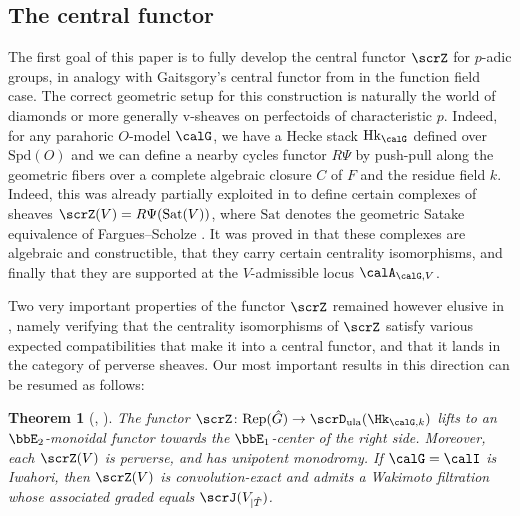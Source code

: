 \documentclass[10pt, reqno]{amsart}
\theoremstyle{plain}
\newtheorem{theorem}{Theorem}[section]
\theoremstyle{definition}
\numberwithin{equation}{section}
\begin{document}
	
	\subsection{The central functor}
	The first goal of this paper is to fully develop the central functor $\scrZ$ for $p$-adic groups, in analogy with Gaitsgory's central functor from \cite{Gai01} in the function field case. The correct geometric setup for this construction is naturally the world of diamonds or more generally v-sheaves on perfectoids of characteristic $p$. Indeed, for any parahoric $O$-model $\calG$, we have a Hecke stack $\mathrm{Hk}_{\calG}$ defined over $\mathrm{Spd}(O)$ and we can define a nearby cycles functor $R\Psi$ by push-pull along the geometric fibers over a complete algebraic closure $C$ of $F$ and the residue field $k$. Indeed, this was already partially exploited in \cite{AGLR22} to define certain complexes of sheaves $\scrZ(V)=R\Psi(\mathrm{Sat}(V))$, where $\mathrm{Sat}$ denotes the geometric Satake equivalence of Fargues--Scholze \cite{FS21}. It was proved in \cite{AGLR22} that these complexes are algebraic and constructible, that they carry certain centrality isomorphisms, and finally that they are supported at the $V$-admissible locus $ \calA_{\calG,V}$.
	
	Two very important properties of the functor $\scrZ$ remained however elusive in \cite{AGLR22}, namely verifying that the centrality isomorphisms of $\scrZ$ satisfy various expected compatibilities that make it into a central functor, and that it lands in the category of perverse sheaves. Our most important results in this direction can be resumed as follows:
	
	\begin{theorem}[, ]
		The functor $\scrZ\colon \mathrm{Rep}(\hat{G}) \to \scrD_{\mathrm{ula}}(\Hk_{\calG, k})$ lifts to an $\bbE_2$-monoidal functor towards the $\bbE_1$-center of the right side. Moreover, each $\scrZ(V)$ is perverse, and has unipotent monodromy. If $\calG=\calI$ is Iwahori, then $\scrZ(V)$ is convolution-exact and admits a Wakimoto filtration whose associated graded equals $\scrJ(V_{|\hat{T}})$.
	\end{theorem}
	
\end{document}
